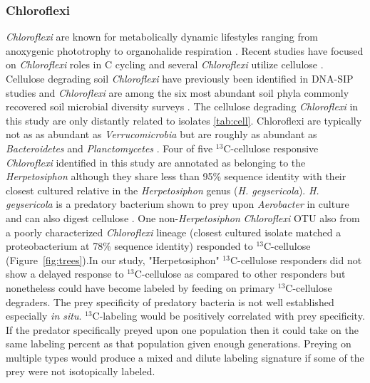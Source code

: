 \subsubsection{Chloroflexi}\label{cell:chloro}
\textit{Chloroflexi} are known for metabolically dynamic
lifestyles ranging from anoxygenic phototrophy to organohalide respiration
\citep{Hug_2013}. Recent studies have focused on \textit{Chloroflexi} roles in
C cycling \citep{Hug_2013, Goldfarb_2011,Cole_2013} and several
\textit{Chloroflexi} utilize cellulose \citep{Goldfarb_2011, Cole_2013,
Hug_2013}. Cellulose degrading soil \textit{Chloroflexi} have previously been
identified in DNA-SIP studies \citep{Schellenberger_2010} and
\textit{Chloroflexi} are among the six most abundant soil phyla commonly
recovered soil microbial diversity surveys \citep{Janssen2006}. The cellulose
degrading \textit{Chloroflexi} in this study are only distantly related to
isolates \ref{tab:cell}. Chloroflexi are typically not as as abundant as
\textit{Verrucomicrobia} but are roughly as abundant as \textit{Bacteroidetes}
and \textit{Planctomycetes} \citep{Janssen2006}. Four of five
$^{13}$C-cellulose responsive \textit{Chloroflexi} identified in this study are
annotated as belonging to the \textit{Herpetosiphon} although they share less
than 95\% sequence identity with their closest cultured relative in the
\textit{Herpetosiphon} genus (\textit{H. geysericola}). \textit{H. geysericola}
is a predatory bacterium shown to prey upon \textit{Aerobacter} in culture and
can also digest cellulose \citep{Lewin1970}. One non-\textit{Herpetosiphon}
\textit{Chloroflexi} OTU also from a poorly characterized \textit{Chloroflexi}
lineage (closest cultured isolate matched a proteobacterium at 78\% sequence
identity) responded to $^{13}$C-cellulose (Figure~\ref{fig:trees}).In our
study, "Herpetosiphon" $^{13}$C-cellulose responders did not show a delayed
response to $^{13}$C-cellulose as compared to other responders but nonetheless
could have become labeled by feeding on primary $^{13}$C-cellulose degraders.
The prey specificity of predatory bacteria is not well established especially
\textit{in situ}. $^{13}$C-labeling would be positively correlated with prey
specificity. If the predator specifically preyed upon one population then it
could take on the same labeling percent as that population given enough
generations. Preying on multiple types would produce a mixed and dilute
labeling signature if some of the prey were not isotopically labeled.


